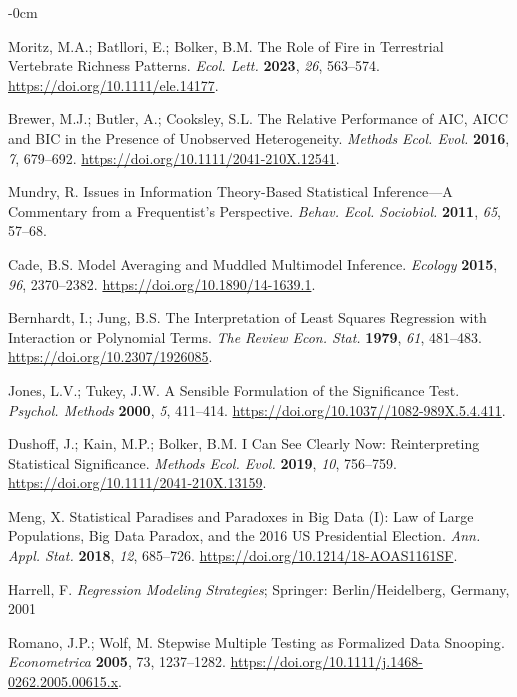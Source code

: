 \documentclass[entropy,article,accept,pdftex,moreauthors]{Definitions/mdpi}
\begin{document}
\begin{adjustwidth}{-\extralength}{0cm}
\begin{thebibliography}{999}
Moritz, M.A.; Batllori, E.; Bolker, B.M.  The
Role of Fire in Terrestrial Vertebrate Richness Patterns. 
\emph{Ecol. Lett.} \textbf{2023}, \emph{26}, 563--574.
\url{https://doi.org/10.1111/ele.14177}.

Brewer, M.J.;  Butler, A.; Cooksley, S.L. The
Relative Performance of {AIC}, {AICC} and {BIC} in the Presence of
Unobserved Heterogeneity.  \emph{Methods Ecol. Evol.} \textbf{2016}, \emph{7}, 679--692. \url{https://doi.org/10.1111/2041-210X.12541}.

Mundry, R. Issues in Information Theory-Based Statistical
Inference---A Commentary from a Frequentist's Perspective. 
\emph{Behav. Ecol. Sociobiol.} \textbf{2011}, \emph{65},  57--68.

Cade, B.S. Model Averaging and Muddled Multimodel
Inference. \emph{Ecology} \textbf{2015}, \emph{96}, 2370--2382. \url{https://doi.org/10.1890/14-1639.1}.

Bernhardt, I.; Jung, B.S.  The Interpretation of Least
Squares Regression with Interaction or Polynomial Terms.  \emph{The
Review Econ. Stat.} \textbf{1979}, \emph{61}, 481--483.
\url{https://doi.org/10.2307/1926085}.

Jones, L.V.;  Tukey, J.W.  A {Sensible} {Formulation}
of the {Significance} {Test}.  \emph{Psychol. Methods} \textbf{2000}, \emph{5}, 
411--414. \url{https://doi.org/10.1037//1082-989X.5.4.411}.

Dushoff, J.; Kain, M.P.; Bolker, B.M.  I
Can See Clearly Now: {Reinterpreting} Statistical Significance. 
\emph{Methods Ecol. Evol.} \textbf{2019}, \emph{10},  756--759.
\url{https://doi.org/10.1111/2041-210X.13159}.

Meng, X.  Statistical Paradises and Paradoxes in Big Data
({I}): {Law} of Large Populations, Big Data Paradox, and the 2016 {US}
Presidential Election.  \emph{Ann. Appl. Stat.} \textbf{2018}, \emph{12},
685--726. \url{https://doi.org/10.1214/18-AOAS1161SF}.

Harrell, F.  \emph{Regression Modeling Strategies};
Springer:  Berlin/Heidelberg, Germany, %
2001

Romano, J.P.;  Wolf, M. Stepwise {Multiple
Testing} as {Formalized Data Snooping}.  \emph{Econometrica} \textbf{2005}, 73, 
1237--1282. \url{https://doi.org/10.1111/j.1468-0262.2005.00615.x}.


\end{thebibliography}
\end{adjustwidth}
\end{document}
